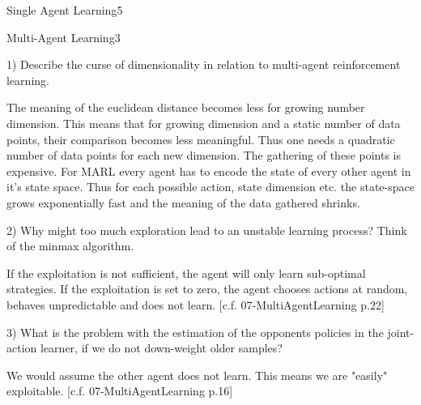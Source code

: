 \begin{questions}
\begin{question}{Single Agent Learning}{5}
\end{question}



\begin{question}{Multi-Agent Learning}{3}
	
	1) Describe the curse of dimensionality in relation to multi-agent reinforcement learning.
\begin{answer}
	
	The meaning of the euclidean distance becomes less for growing number dimension. This means that for growing dimension and a static number of data points, their comparison becomes less meaningful. Thus one needs a quadratic number of data points for each new dimension. The gathering of these points is expensive.
	For MARL every agent has to encode the state of every other agent in it's state space. Thus for each possible action, state dimension etc. the state-space grows exponentially fast and the meaning of the data gathered shrinks. 
\end{answer}
	
	2) Why might too much exploration lead to an unstable learning process? Think of the minmax algorithm.
\begin{answer}
	
	If the exploitation is not sufficient, the agent will only learn sub-optimal strategies. If the exploitation is set to zero, the agent chooses actions at random, behaves unpredictable and does not learn.
	[c.f. 07-MultiAgentLearning p.22]
\end{answer}
	
	3) What is the problem with the estimation of the opponents policies in the joint-action learner, if we do
	not down-weight older samples?
\begin{answer}
	
	We would assume the other agent does not learn. This means we are "easily" exploitable.
	[c.f. 07-MultiAgentLearning p.16]
\end{answer}
\end{question}

\end{questions}
